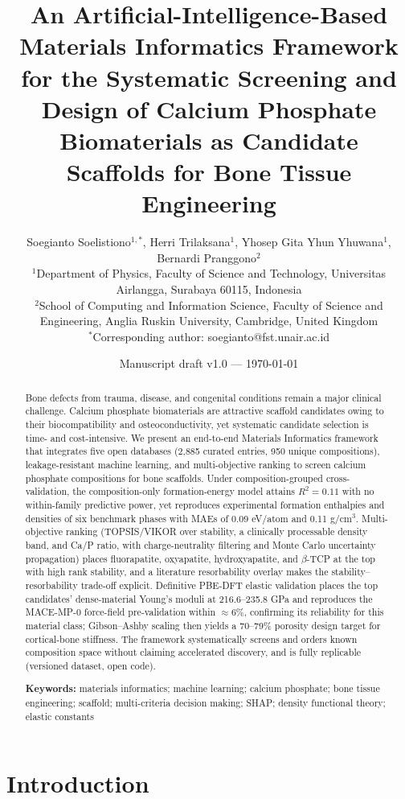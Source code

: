 \documentclass[11pt,a4paper]{article}
\title{\bfseries An Artificial-Intelligence-Based Materials Informatics Framework for the Systematic Screening and Design of Calcium Phosphate Biomaterials as Candidate Scaffolds for Bone Tissue Engineering}
\author{
Soegianto Soelistiono$^{1,\ast}$, Herri Trilaksana$^{1}$, Yhosep Gita Yhun Yhuwana$^{1}$,\\
Bernardi Pranggono$^{2}$\\[4pt]
\small $^{1}$Department of Physics, Faculty of Science and Technology, Universitas Airlangga, Surabaya 60115, Indonesia\\
\small $^{2}$School of Computing and Information Science, Faculty of Science and Engineering, Anglia Ruskin University, Cambridge, United Kingdom\\[4pt]
\small $^{\ast}$Corresponding author: soegianto@fst.unair.ac.id
}
\date{Manuscript draft v1.0 --- \today}
\begin{document}
\maketitle

\begin{abstract}
Bone defects from trauma, disease, and congenital conditions remain a major clinical challenge. Calcium phosphate biomaterials are attractive scaffold candidates owing to their biocompatibility and osteoconductivity, yet systematic candidate selection is time- and cost-intensive. We present an end-to-end Materials Informatics framework that integrates five open databases (2{,}885 curated entries, 950 unique compositions), leakage-resistant machine learning, and multi-objective ranking to screen calcium phosphate compositions for bone scaffolds. Under composition-grouped cross-validation, the composition-only formation-energy model attains $R^2 = 0.11$ with no within-family predictive power, yet reproduces experimental formation enthalpies and densities of six benchmark phases with MAEs of 0.09 eV/atom and 0.11 g/cm$^3$. Multi-objective ranking (TOPSIS/VIKOR over stability, a clinically processable density band, and Ca/P ratio, with charge-neutrality filtering and Monte Carlo uncertainty propagation) places fluorapatite, oxyapatite, hydroxyapatite, and $\beta$-TCP at the top with high rank stability, and a literature resorbability overlay makes the stability--resorbability trade-off explicit. Definitive PBE-DFT elastic validation places the top candidates' dense-material Young's moduli at 216.6--235.8 GPa and reproduces the MACE-MP-0 force-field pre-validation within $\approx$6\%, confirming its reliability for this material class; Gibson--Ashby scaling then yields a 70--79\% porosity design target for cortical-bone stiffness. The framework systematically screens and orders known composition space without claiming accelerated discovery, and is fully replicable (versioned dataset, open code).

\noindent\textbf{Keywords:} materials informatics; machine learning; calcium phosphate; bone tissue engineering; scaffold; multi-criteria decision making; SHAP; density functional theory; elastic constants
\end{abstract}

\section{Introduction}
\end{document}
